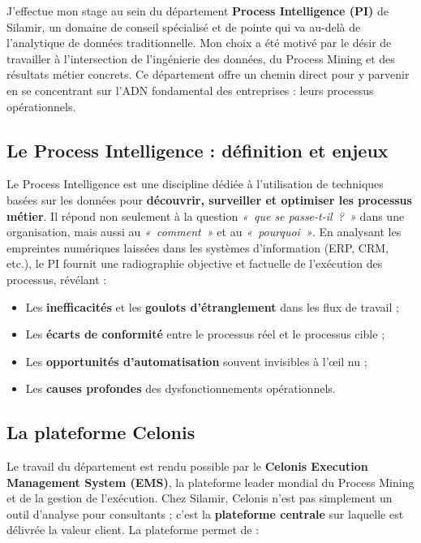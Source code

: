 J'effectue mon stage au sein du département \textbf{Process Intelligence (PI)} de Silamir, un domaine de conseil spécialisé et de pointe qui va au-delà de l'analytique de données traditionnelle. Mon choix a été motivé par le désir de travailler à l'intersection de l'ingénierie des données, du Process Mining et des résultats métier concrets. Ce département offre un chemin direct pour y parvenir en se concentrant sur l'ADN fondamental des entreprises : leurs processus opérationnels.

\subsection{Le Process Intelligence : définition et enjeux}

Le Process Intelligence est une discipline dédiée à l'utilisation de techniques basées sur les données pour \textbf{découvrir, surveiller et optimiser les processus métier}. Il répond non seulement à la question \textit{«~que se passe-t-il~?~»} dans une organisation, mais aussi au \textit{«~comment~»} et au \textit{«~pourquoi~»}. En analysant les empreintes numériques laissées dans les systèmes d'information (ERP, CRM, etc.), le PI fournit une radiographie objective et factuelle de l'exécution des processus, révélant :

\begin{itemize}
    \item Les \textbf{inefficacités} et les \textbf{goulots d'étranglement} dans les flux de travail ;
    \item Les \textbf{écarts de conformité} entre le processus réel et le processus cible ;
    \item Les \textbf{opportunités d'automatisation} souvent invisibles à l'œil nu ;
    \item Les \textbf{causes profondes} des dysfonctionnements opérationnels.
\end{itemize}

\subsection{La plateforme Celonis}

Le travail du département est rendu possible par le \textbf{Celonis Execution Management System (EMS)}, la plateforme leader mondial du Process Mining et de la gestion de l'exécution. Chez Silamir, Celonis n'est pas simplement un outil d'analyse pour consultants ; c'est la \textbf{plateforme centrale} sur laquelle est délivrée la valeur client. La plateforme permet de :

